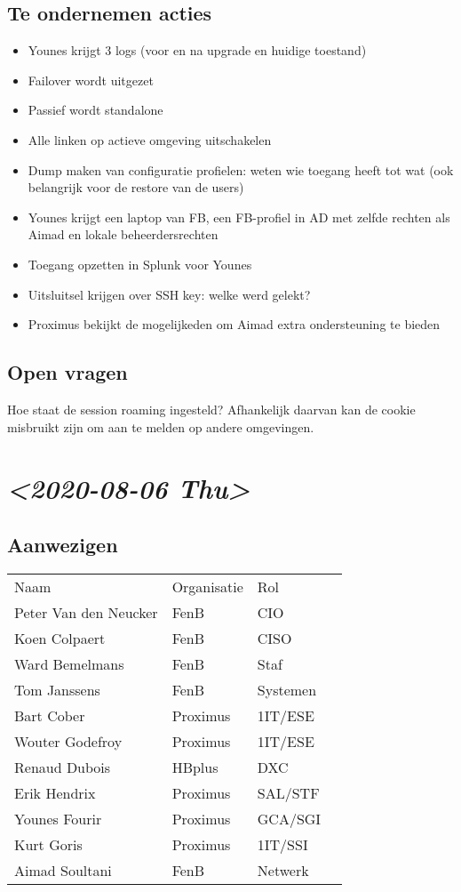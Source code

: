 \documentclass[11pt]{article}
\begin{document}
\subsection{Te ondernemen acties}
\label{sec:org8fdb017}
\begin{itemize}
\item Younes krijgt 3 logs (voor en na upgrade en huidige toestand)
\item Failover wordt uitgezet
\item Passief wordt standalone
\item Alle linken op actieve omgeving uitschakelen
\item Dump maken van configuratie profielen: weten wie toegang heeft tot wat (ook belangrijk voor de restore van de users)
\item Younes krijgt een laptop van FB, een FB-profiel in AD met zelfde rechten als Aimad en lokale beheerdersrechten
\item Toegang opzetten in Splunk voor Younes
\item Uitsluitsel krijgen over SSH key: welke werd gelekt?
\item Proximus bekijkt de mogelijkeden om Aimad extra ondersteuning te bieden
\end{itemize}

\subsection{Open vragen}
\label{sec:org065184e}
Hoe staat de session roaming ingesteld? Afhankelijk daarvan kan de cookie misbruikt zijn om aan te melden op andere omgevingen.


\section{\textit{<2020-08-06 Thu>}}
\label{sec:orga42d3cf}
\subsection{Aanwezigen}
\label{sec:org89014cd}


\begin{center}
\begin{tabular}{llll}
Naam & Organisatie & Rol & \\
Peter Van den Neucker & FenB & CIO & \\
Koen Colpaert & FenB & CISO & \\
Ward Bemelmans & FenB & Staf & \\
Tom Janssens & FenB & Systemen & \\
Bart Cober & Proximus & 1IT/ESE & \\
Wouter Godefroy & Proximus & 1IT/ESE & \\
Renaud Dubois & HBplus & DXC & \\
Erik Hendrix & Proximus & SAL/STF & \\
Younes Fourir & Proximus & GCA/SGI & \\
Kurt Goris & Proximus & 1IT/SSI & \\
Aimad Soultani & FenB & Netwerk & \\
\end{tabular}
\end{center}
\end{document}
